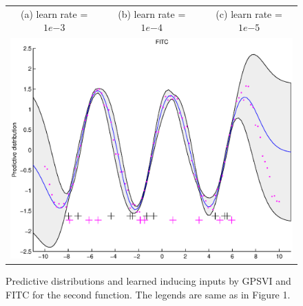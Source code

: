 \documentclass{article} %
\begin{document}
\begin{figure}
\begin{tabular}{ccc}
(a) learn rate = $1e{-3}$ & (b) learn rate = $1e{-4}$ & (c) learn rate = $1e{-5}$ \\
\multicolumn{3}{c}{\includegraphics[scale=0.4]{figures/func2-fitc.eps}}
\end{tabular}
\caption{Predictive distributions and learned inducing inputs by GPSVI and FITC for the second function. The legends are same as in Figure 1.}
\label{fig2}
\end{figure}
\end{document}

